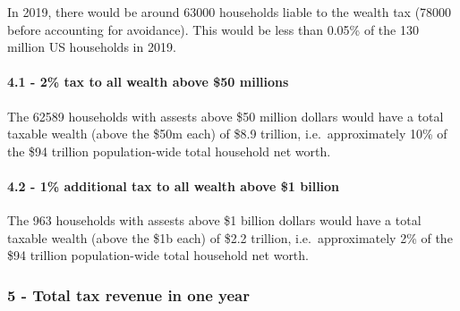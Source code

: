 \documentclass[]{article}
\let\oldparagraph\paragraph
\renewcommand{\paragraph}[1]{\oldparagraph{#1}\mbox{}}
\begin{document}
In 2019, there would be around 63000 households liable to the wealth tax
(78000 before accounting for avoidance). This would be less than 0.05\%
of the 130 million US households in 2019.

\hypertarget{tax-to-all-wealth-above-50-millions}{%
\paragraph{4.1 - 2\% tax to all wealth above \$50
millions}\label{tax-to-all-wealth-above-50-millions}}

The 62589 households with assests above \$50 million dollars would have
a total taxable wealth (above the \$50m each) of \$8.9 trillion,
i.e.~approximately 10\% of the \$94 trillion population-wide total
household net worth.

\hypertarget{additional-tax-to-all-wealth-above-1-billion}{%
\paragraph{4.2 - 1\% additional tax to all wealth above \$1
billion}\label{additional-tax-to-all-wealth-above-1-billion}}

The 963 households with assests above \$1 billion dollars would have a
total taxable wealth (above the \$1b each) of \$2.2 trillion,
i.e.~approximately 2\% of the \$94 trillion population-wide total
household net worth.

\hypertarget{total-tax-revenue-in-one-year}{%
\subsubsection{5 - Total tax revenue in one
year}\label{total-tax-revenue-in-one-year}}
\end{document}
